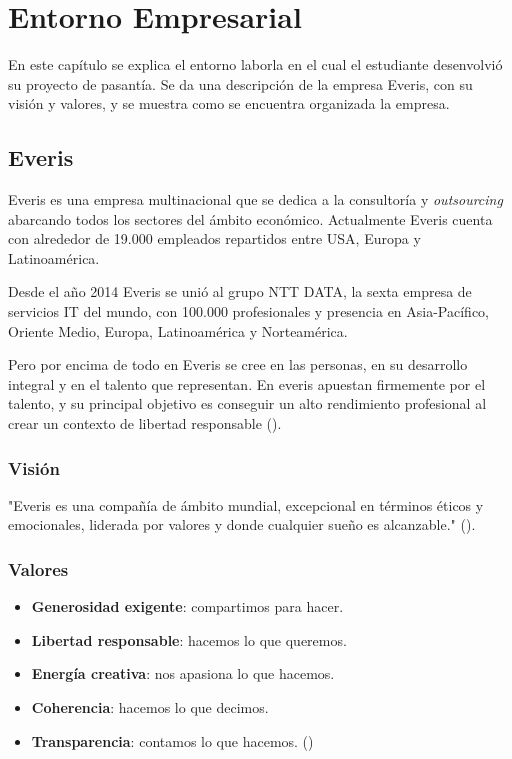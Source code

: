 \chapter{Entorno Empresarial}
\label{capitulo1}

En este capítulo se explica el entorno laborla en el cual el
estudiante desenvolvió su proyecto de pasantía. Se da una descripción
de la empresa Everis, con su visión y valores, y se muestra
como se encuentra organizada la empresa.


\section{Everis}

Everis es una empresa multinacional que se dedica a la consultoría y
\emph{outsourcing} abarcando todos los sectores del ámbito económico.
Actualmente Everis cuenta con alrededor de 19.000
empleados repartidos entre USA, Europa y Latinoamérica.

Desde el año 2014 Everis se unió al grupo NTT DATA, la sexta empresa de
servicios IT del mundo, con 100.000 profesionales y presencia en Asia-Pacífico,
Oriente Medio, Europa, Latinoamérica y Norteamérica.

Pero por encima de todo en Everis se cree en las personas, en su desarrollo integral y en
el talento que representan. En everis apuestan firmemente por el talento, y
su principal objetivo es conseguir un alto rendimiento profesional al crear
un contexto de libertad responsable (\cite{EVERIS}).

\subsection{Visión}

"Everis es una compañía de ámbito mundial, excepcional en términos éticos y
emocionales, liderada por valores y donde cualquier sueño es alcanzable." (\cite{EVERIS}).

\subsection{Valores}

\begin{itemize}
  \item \textbf{Generosidad exigente}: compartimos para hacer.
  \item \textbf{Libertad responsable}: hacemos lo que queremos.
  \item \textbf{Energía creativa}: nos apasiona lo que hacemos.
  \item \textbf{Coherencia}: hacemos lo que decimos.
  \item \textbf{Transparencia}: contamos lo que hacemos. (\cite{EVERIS})
\end{itemize}






